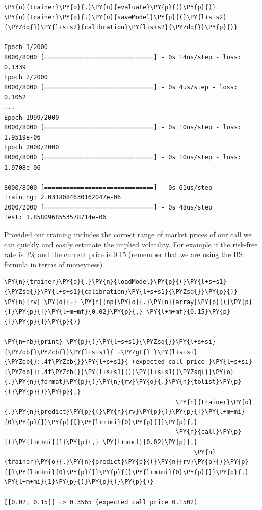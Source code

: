 \begin{tcolorbox}[breakable, size=fbox, boxrule=1pt, pad at break*=1mm,colback=cellbackground, colframe=cellborder]
\begin{Verbatim}[commandchars=\\\{\}]
\PY{n}{trainer}\PY{o}{.}\PY{n}{evaluate}\PY{p}{(}\PY{p}{)}
\PY{n}{trainer}\PY{o}{.}\PY{n}{saveModel}\PY{p}{(}\PY{l+s+s2}{\PYZdq{}}\PY{l+s+s2}{calibration}\PY{l+s+s2}{\PYZdq{}}\PY{p}{)}

Epoch 1/2000
8000/8000 [==============================] - 0s 14us/step - loss: 0.1339
Epoch 2/2000
8000/8000 [==============================] - 0s 4us/step - loss: 0.1052
...
Epoch 1999/2000
8000/8000 [==============================] - 0s 10us/step - loss: 1.9519e-06
Epoch 2000/2000
8000/8000 [==============================] - 0s 10us/step - loss: 1.9708e-06

8000/8000 [==============================] - 0s 61us/step
Training: 2.0318084630162047e-06
2000/2000 [==============================] - 0s 48us/step
Test: 1.8580968553578714e-06
\end{Verbatim}
\end{tcolorbox}

Provided our training includes the correct range of market prices of our
call we can quickly and easily estimate the implied volatility. For
example if the risk-free rate is 2\% and the current price is 0.15
(remember that we are using the BS formula in terms of moneyness)

\begin{tcolorbox}[breakable, size=fbox, boxrule=1pt, pad at break*=1mm,colback=cellbackground, colframe=cellborder]
\begin{Verbatim}[commandchars=\\\{\}]
\PY{n}{trainer}\PY{o}{.}\PY{n}{loadModel}\PY{p}{(}\PY{l+s+s1}{\PYZsq{}}\PY{l+s+s1}{calibration}\PY{l+s+s1}{\PYZsq{}}\PY{p}{)}
\PY{n}{rv} \PY{o}{=} \PY{n}{np}\PY{o}{.}\PY{n}{array}\PY{p}{(}\PY{p}{[}\PY{p}{[}\PY{l+m+mf}{0.02}\PY{p}{,} \PY{l+m+mf}{0.15}\PY{p}{]}\PY{p}{]}\PY{p}{)}
	
\PY{n+nb}{print} \PY{p}{(}\PY{l+s+s1}{\PYZsq{}}\PY{l+s+si}{\PYZob{}\PYZcb{}}\PY{l+s+s1}{ =\PYZgt{} }\PY{l+s+si}{\PYZob{}:.4f\PYZcb{}}\PY{l+s+s1}{ (expected call price }\PY{l+s+si}{\PYZob{}:.4f\PYZcb{}}\PY{l+s+s1}{)}\PY{l+s+s1}{\PYZsq{}}\PY{o}{.}\PY{n}{format}\PY{p}{(}\PY{n}{rv}\PY{o}{.}\PY{n}{tolist}\PY{p}{(}\PY{p}{)}\PY{p}{,} 
                                               \PY{n}{trainer}\PY{o}{.}\PY{n}{predict}\PY{p}{(}\PY{n}{rv}\PY{p}{)}\PY{p}{[}\PY{l+m+mi}{0}\PY{p}{]}\PY{p}{[}\PY{l+m+mi}{0}\PY{p}{]}\PY{p}{,} 
                                               \PY{n}{call}\PY{p}{(}\PY{l+m+mi}{1}\PY{p}{,} \PY{l+m+mf}{0.02}\PY{p}{,} 
                                                    \PY{n}{trainer}\PY{o}{.}\PY{n}{predict}\PY{p}{(}\PY{n}{rv}\PY{p}{)}\PY{p}{[}\PY{l+m+mi}{0}\PY{p}{]}\PY{p}{[}\PY{l+m+mi}{0}\PY{p}{]}\PY{p}{,} \PY{l+m+mi}{1}\PY{p}{)}\PY{p}{)}\PY{p}{)}

[[0.02, 0.15]] => 0.3565 (expected call price 0.1502)
\end{Verbatim}
\end{tcolorbox}

